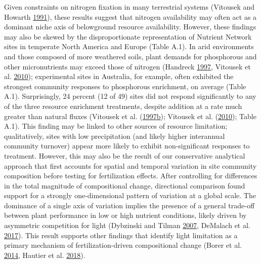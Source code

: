 \documentclass[twoside,12pt,final]{ucthesis-CA2012}
\begin{document}
\begin{ucmainmatter}
Given constraints on nitrogen fixation in many terrestrial systems (Vitousek and Howarth \protect\hyperlink{ref-Vitousek1991}{1991}), these results suggest that nitrogen availability may often act as a dominant niche axis of belowground resource availability. However, these findings may also be skewed by the disproportionate representation of Nutrient Network sites in temperate North America and Europe (Table A.1). In arid environments and those composed of more weathered soils, plant demands for phosphorous and other micronutrients may exceed those of nitrogen (Handreck \protect\hyperlink{ref-Handreck1997}{1997}, Vitousek et al. \protect\hyperlink{ref-Vitousek2010}{2010}); experimental sites in Australia, for example, often exhibited the strongest community responses to phosphorous enrichment, on average (Table A.1).
Surprisingly, 24 percent (12 of 49) sites did not respond significantly to any of the three resource enrichment treatments, despite addition at a rate much greater than natural fluxes (Vitousek et al. (\protect\hyperlink{ref-Vitousek1997}{1997}\protect\hyperlink{ref-Vitousek1997}{b}); Vitousek et al. (\protect\hyperlink{ref-Vitousek2010}{2010}); Table A.1). This finding may be linked to other sources of resource limitation; qualitatively, sites with low precipitation (and likely higher interannual community turnover) appear more likely to exhibit non-significant responses to treatment. However, this may also be the result of our conservative analytical approach that first accounts for spatial and temporal variation in site community composition before testing for fertilization effects.
After controlling for differences in the total magnitude of compositional change, directional comparison found support for a strongly one-dimensional pattern of variation at a global scale. The dominance of a single axis of variation implies the presence of a general trade-off between plant performance in low or high nutrient conditions, likely driven by asymmetric competition for light (Dybzinski and Tilman \protect\hyperlink{ref-Dybzinski2007a}{2007}, DeMalach et al. \protect\hyperlink{ref-DeMalach2017a}{2017}). This result supports other findings that identify light limitation as a primary mechanism of fertilization-driven compositional change (Borer et al. \protect\hyperlink{ref-Borer2014a}{2014}, Hautier et al. \protect\hyperlink{ref-Hautier2018}{2018}).


\end{ucmainmatter}
\end{document}
